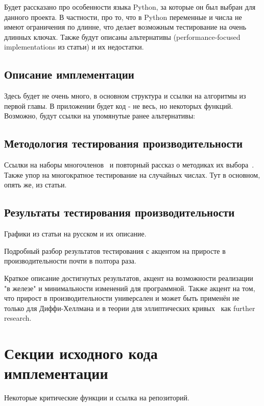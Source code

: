 \documentclass[times,specification,annotation]{itmo-student-thesis}
\begin{document}
Будет рассказано про особенности языка Python, за которые он был выбран для данного проекта.
В частности, про то, что в Python переменные и числа не имеют ограничения по длинне, что делает
возможным тестирование на очень длинных ключах.
Также будут описаны альтернативы (performance-focused implementations из статьи) и их недостатки.

\section{Описание имплементации}\label{sec:impl}

Здесь будет не очень много, в основном структура и ссылки на алгоритмы из первой главы.
В приложении будет код - не весь, но некоторых функций.
Возможно, будут ссылки на упомянутые ранее альтернативы:~\cite{pri16, mau15}

\section{Методология тестирования производительности}\label{sec:meth}

Ссылки на наборы многочленов~\cite{rfc7296, rfc3526} и повторный рассказ о методиках их выбора~\cite{rfc2412}.
Также упор на многократное тестирование на случайных числах.
Тут в основном, опять же, из статьи.

\section{Результаты тестирования производительности}\label{sec:results}

Графики из статьи на русском и их описание.

\chapterconclusion

Подробный разбор результатов тестирования с акцентом на приросте в производительности почти в полтора раза.

\startconclusionpage

Краткое описание достигнутых результатов, акцент на возможности реализации "в железе"
и минимальности изменений для программной.
Также акцент на том, что прирост в производительности универсален и может быть применён не только для Диффи-Хеллмана
и в теории для эллиптических кривых~\cite{sta03} как further research.

\printmainbibliography


\appendix

\chapter{Секции исходного кода имплементации}\label{sec:app:1}

    Некоторые критические функции и ссылка на репозиторий.
\end{document}
